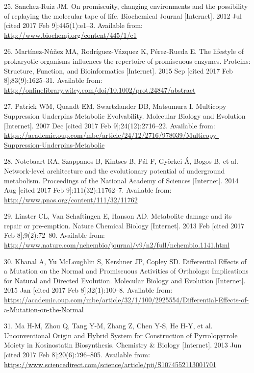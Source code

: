 \documentclass[12pt,twoside]{reedthesis}
\begin{document}
  \hypertarget{ref-sanchez-ruiz_promiscuity_2012}{}
  25. Sanchez-Ruiz JM. On promiscuity, changing environments and the
  possibility of replaying the molecular tape of life. Biochemical Journal
  {[}Internet{]}. 2012 Jul {[}cited 2017 Feb 9{]};445(1):e1--3. Available
  from: \url{http://www.biochemj.org/content/445/1/e1}
  
  \hypertarget{ref-martinez-nunez_lifestyle_2015}{}
  26. Martínez-Núñez MA, Rodríguez-Vázquez K, Pérez-Rueda E. The lifestyle
  of prokaryotic organisms influences the repertoire of promiscuous
  enzymes. Proteins: Structure, Function, and Bioinformatics
  {[}Internet{]}. 2015 Sep {[}cited 2017 Feb 8{]};83(9):1625--31.
  Available from:
  \url{http://onlinelibrary.wiley.com/doi/10.1002/prot.24847/abstract}
  
  \hypertarget{ref-patrick_multicopy_2007}{}
  27. Patrick WM, Quandt EM, Swartzlander DB, Matsumura I. Multicopy
  Suppression Underpins Metabolic Evolvability. Molecular Biology and
  Evolution {[}Internet{]}. 2007 Dec {[}cited 2017 Feb
  9{]};24(12):2716--22. Available from:
  \url{https://academic.oup.com/mbe/article/24/12/2716/978039/Multicopy-Suppression-Underpins-Metabolic}
  
  \hypertarget{ref-notebaart_network-level_2014}{}
  28. Notebaart RA, Szappanos B, Kintses B, Pál F, Györkei Á, Bogos B, et
  al. Network-level architecture and the evolutionary potential of
  underground metabolism. Proceedings of the National Academy of Sciences
  {[}Internet{]}. 2014 Aug {[}cited 2017 Feb 9{]};111(32):11762--7.
  Available from: \url{http://www.pnas.org/content/111/32/11762}
  
  \hypertarget{ref-linster_metabolite_2013}{}
  29. Linster CL, Van Schaftingen E, Hanson AD. Metabolite damage and its
  repair or pre-emption. Nature Chemical Biology {[}Internet{]}. 2013 Feb
  {[}cited 2017 Feb 8{]};9(2):72--80. Available from:
  \url{http://www.nature.com/nchembio/journal/v9/n2/full/nchembio.1141.html}
  
  \hypertarget{ref-khanal_differential_2015}{}
  30. Khanal A, Yu McLoughlin S, Kershner JP, Copley SD. Differential
  Effects of a Mutation on the Normal and Promiscuous Activities of
  Orthologs: Implications for Natural and Directed Evolution. Molecular
  Biology and Evolution {[}Internet{]}. 2015 Jan {[}cited 2017 Feb
  8{]};32(1):100--8. Available from:
  \url{https://academic.oup.com/mbe/article/32/1/100/2925554/Differential-Effects-of-a-Mutation-on-the-Normal}
  
  \hypertarget{ref-ma_unconventional_2013}{}
  31. Ma H-M, Zhou Q, Tang Y-M, Zhang Z, Chen Y-S, He H-Y, et al.
  Unconventional Origin and Hybrid System for Construction of
  Pyrrolopyrrole Moiety in Kosinostatin Biosynthesis. Chemistry \& Biology
  {[}Internet{]}. 2013 Jun {[}cited 2017 Feb 8{]};20(6):796--805.
  Available from:
  \url{https://www.sciencedirect.com/science/article/pii/S1074552113001701}
  
\end{document}
